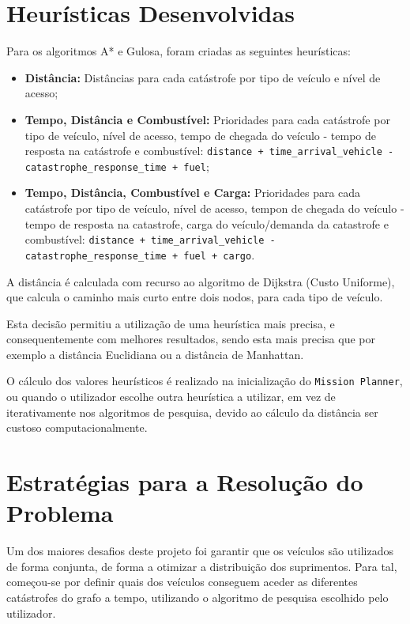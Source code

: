 \documentclass[a4paper,12pt]{scrreprt}
\begin{document}
\section{Heurísticas Desenvolvidas}

Para os algoritmos A* e Gulosa, foram criadas as seguintes heurísticas:

\begin{itemize}
    \item \textbf{Distância:} Distâncias para cada catástrofe por tipo de veículo e nível de acesso;
    \item \textbf{Tempo, Distância e Combustível:} Prioridades para cada catástrofe por tipo de veículo, nível de acesso,
    tempo de chegada do veículo - tempo de resposta na catástrofe e combustível: 
    \texttt{distance + time\_arrival\_vehicle - \\ catastrophe\_response\_time + fuel};
    \item \textbf{Tempo, Distância, Combustível e Carga:} Prioridades para cada catástrofe por tipo de veículo, nível de acesso,
    tempon de chegada do veículo - tempo de resposta na catastrofe, carga do veículo/demanda da catastrofe e combustível: 
    \texttt{distance + time\_arrival\_vehicle - catastrophe\_response\_time + fuel + cargo}.
\end{itemize}

A distância é calculada com recurso ao algoritmo de Dijkstra (Custo Uniforme), que calcula o caminho mais curto entre dois nodos, para cada tipo de veículo.

Esta decisão permitiu a utilização de uma heurística mais precisa, e consequentemente com melhores resultados, sendo esta mais precisa que por exemplo a distância Euclidiana ou
a distância de Manhattan.

O cálculo dos valores heurísticos é realizado na inicialização do \texttt{Mission Planner}, ou quando o utilizador escolhe outra heurística a utilizar,
em vez de iterativamente nos algoritmos de pesquisa, devido ao cálculo da distância ser custoso computacionalmente.

\clearpage

\section{Estratégias para a Resolução do Problema}

Um dos maiores desafios deste projeto foi garantir que os veículos são utilizados de forma conjunta, de forma a otimizar a distribuição dos suprimentos.
Para tal, começou-se por definir quais dos veículos conseguem aceder as diferentes catástrofes do grafo a tempo, utilizando o algoritmo de pesquisa escolhido
pelo utilizador. 
\end{document}
